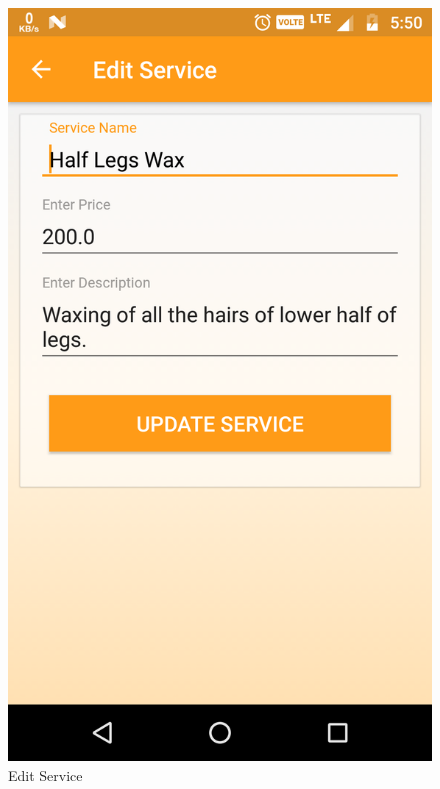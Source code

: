 \\
\begin{figure}[h]
	\centering
	\includegraphics[width=0.7\linewidth]{EditService}
	\caption{Edit Service}
\end{figure}
\pagebreak


